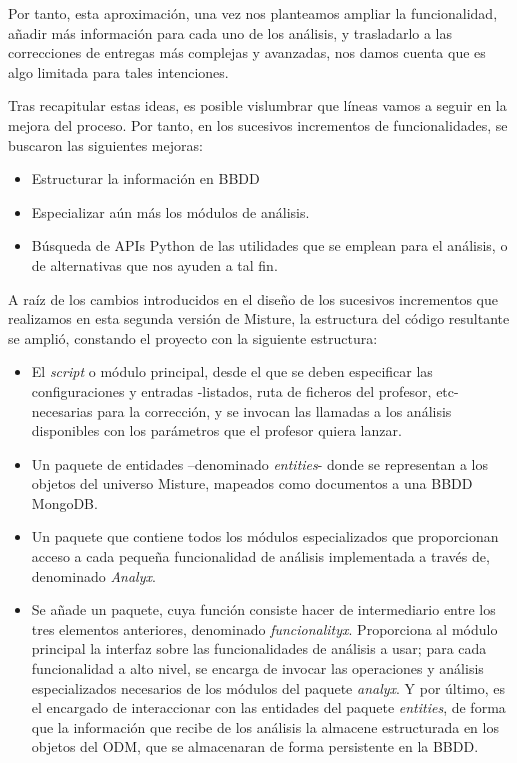 Por tanto, esta aproximación, una vez nos planteamos ampliar la funcionalidad, añadir más información para cada uno de los análisis, y trasladarlo a las correcciones de entregas más complejas y avanzadas, nos damos cuenta que es algo limitada para tales intenciones.


Tras recapitular estas ideas, es posible vislumbrar que líneas vamos a seguir en la mejora del proceso. Por tanto, en los sucesivos incrementos de funcionalidades, se buscaron las siguientes mejoras:

\begin{itemize}
\item Estructurar la información en BBDD

\item Especializar aún más los módulos de análisis.

\item Búsqueda de APIs Python de las utilidades que se emplean para el análisis, o de alternativas que nos ayuden a tal fin.
\end{itemize}

A raíz de los cambios introducidos en el diseño de los sucesivos incrementos que realizamos en esta segunda versión de Misture, la estructura del código resultante se amplió, constando el proyecto con la siguiente estructura:

\begin{itemize}
\item El \textit{script} o módulo principal, desde el que se deben especificar las configuraciones y entradas -listados, ruta de ficheros del profesor, etc- necesarias para la corrección, y se invocan las llamadas a los análisis disponibles con los parámetros que el profesor quiera lanzar.

\item Un paquete de entidades –denominado \textit{entities}- donde se representan a los objetos del universo Misture, mapeados como documentos a una BBDD MongoDB.

\item Un paquete que contiene todos los módulos especializados que proporcionan acceso a cada pequeña funcionalidad de análisis implementada a través de, denominado \textit{Analyx}.

\item Se añade un paquete, cuya función consiste hacer de intermediario entre los tres elementos anteriores, denominado \textit{funcionalityx}. Proporciona al módulo principal la interfaz sobre las funcionalidades de análisis a usar; para cada funcionalidad a alto nivel, se encarga de invocar las operaciones y análisis especializados necesarios de los módulos del paquete \textit{analyx}. Y por último, es el encargado de interaccionar con las entidades del paquete \textit{entities}, de forma que la información que recibe de los análisis la almacene estructurada en los objetos del ODM, que se almacenaran de forma persistente en la BBDD.
\end{itemize}

